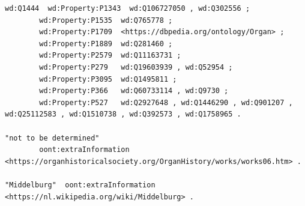 \begin{lstlisting}[caption={Part01\_001MIDDE}]
wd:Q1444  wd:Property:P1343  wd:Q106727050 , wd:Q302556 ;
        wd:Property:P1535  wd:Q765778 ;
        wd:Property:P1709  <https://dbpedia.org/ontology/Organ> ;
        wd:Property:P1889  wd:Q281460 ;
        wd:Property:P2579  wd:Q11163731 ;
        wd:Property:P279   wd:Q19603939 , wd:Q52954 ;
        wd:Property:P3095  wd:Q1495811 ;
        wd:Property:P366   wd:Q60733114 , wd:Q9730 ;
        wd:Property:P527   wd:Q2927648 , wd:Q1446290 , wd:Q901207 , wd:Q25112583 , wd:Q1510738 , wd:Q392573 , wd:Q1758965 .

"not to be determined"
        oont:extraInformation  <https://organhistoricalsociety.org/OrganHistory/works/works06.htm> .

"Middelburg"  oont:extraInformation  <https://nl.wikipedia.org/wiki/Middelburg> .

\end{lstlisting} 
